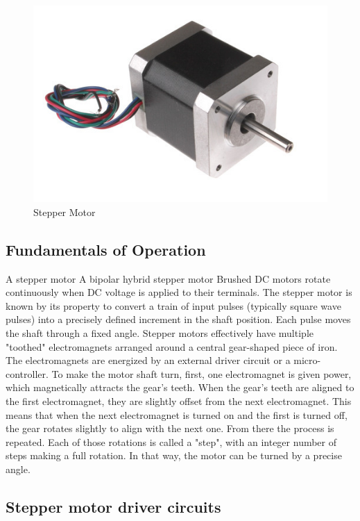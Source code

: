 \documentclass[MTech]{iitmdiss}
\begin{document}
\begin{figure}
	\includegraphics[scale = 4]{ffigures/stepper}
	\centering
	\caption{Stepper Motor}
	\label{fig:step1}
	
\end{figure}

\subsection{Fundamentals of Operation}

A stepper motor A bipolar hybrid stepper motor Brushed DC motors rotate continuously when DC voltage is applied to their terminals. The stepper motor is known by its property to convert a train of input pulses (typically square wave pulses) into a precisely defined increment in the shaft position. Each pulse moves the shaft through a fixed angle. Stepper motors effectively have multiple "toothed" electromagnets arranged around a central gear-shaped piece of iron. The electromagnets are energized by an external driver circuit or a micro-controller. To make the motor shaft turn, first, one electromagnet is given power, which magnetically attracts the gear's teeth. When the gear's teeth are aligned to the first electromagnet, they are slightly offset from the next electromagnet. This means that when the next electromagnet is turned on and the first is turned off, the gear rotates slightly to align with the next one. From there the process is repeated. Each of those rotations is called a "step", with an integer number of steps making a full rotation. In that way, the motor can be turned by a precise angle.

\subsection{Stepper motor driver circuits}
\end{document}

